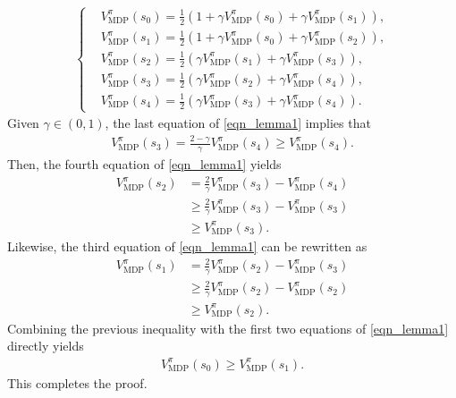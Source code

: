 \begin{myproof}
\begin{align}
    \begin{cases}
    &\!\!\!\!\!\! V_\text{MDP}^{\pi}(s_0) = \frac{1}{2} \left(1 + \gamma V_\text{MDP}^{\pi}(s_0) + \gamma V_\text{MDP}^{\pi}(s_1) \right),  \\
    &\!\!\!\!\!\! V_\text{MDP}^{\pi}(s_1) = \frac{1}{2} \left(1 + \gamma V_\text{MDP}^{\pi}(s_0) +  \gamma V_\text{MDP}^{\pi}(s_2) \right),  \\
    &\!\!\!\!\!\! V_\text{MDP}^{\pi}(s_2) = \frac{1}{2} \left(\gamma V_\text{MDP}^{\pi}(s_1) + \gamma V_\text{MDP}^{\pi}(s_3) \right),  \\
    &\!\!\!\!\!\! V_\text{MDP}^{\pi}(s_3) = \frac{1}{2} \left( \gamma V_\text{MDP}^{\pi}(s_2) + \gamma V_\text{MDP}^{\pi}(s_4) \right),  \\
    &\!\!\!\!\!\! V_\text{MDP}^{\pi}(s_4) = \frac{1}{2} \left( \gamma V_\text{MDP}^{\pi}(s_3) +  \gamma V_\text{MDP}^{\pi}(s_4) \right).
    \end{cases}
    \end{align}
Given $\gamma \in (0, 1)$, the last equation of \eqref{eqn_lemma1} implies that
\begin{align}
    V_\text{MDP}^{\pi}(s_3) = \frac{2-\gamma}{\gamma} V_\text{MDP}^{\pi}(s_4) \geq V_\text{MDP}^{\pi}(s_4).
\end{align}
Then, the fourth equation of \eqref{eqn_lemma1} yields
\begin{align}
    V_\text{MDP}^{\pi}(s_2) &= \frac{2}{\gamma} V_\text{MDP}^{\pi}(s_3) - V_\text{MDP}^{\pi}(s_4) \\ 
    &\geq \frac{2}{\gamma} V_\text{MDP}^{\pi}(s_3) - V_\text{MDP}^{\pi}(s_3) \\
    &\geq V_\text{MDP}^{\pi}(s_3).
\end{align}
%
Likewise, the third equation of \eqref{eqn_lemma1} can be rewritten as
\begin{align}
    V_\text{MDP}^{\pi}(s_1) &= \frac{2}{\gamma} V_\text{MDP}^{\pi}(s_2) - V_\text{MDP}^{\pi}(s_3) \\ 
    &\geq \frac{2}{\gamma} V_\text{MDP}^{\pi}(s_2) - V_\text{MDP}^{\pi}(s_2) \\
    &\geq V_\text{MDP}^{\pi}(s_2).
\end{align}
%
Combining the previous inequality with the first two equations of \eqref{eqn_lemma1} directly yields
\begin{align}
    V_\text{MDP}^{\pi}(s_0) \geq V_\text{MDP}^{\pi}(s_1).
\end{align}
This completes the proof.
    
\end{myproof}



